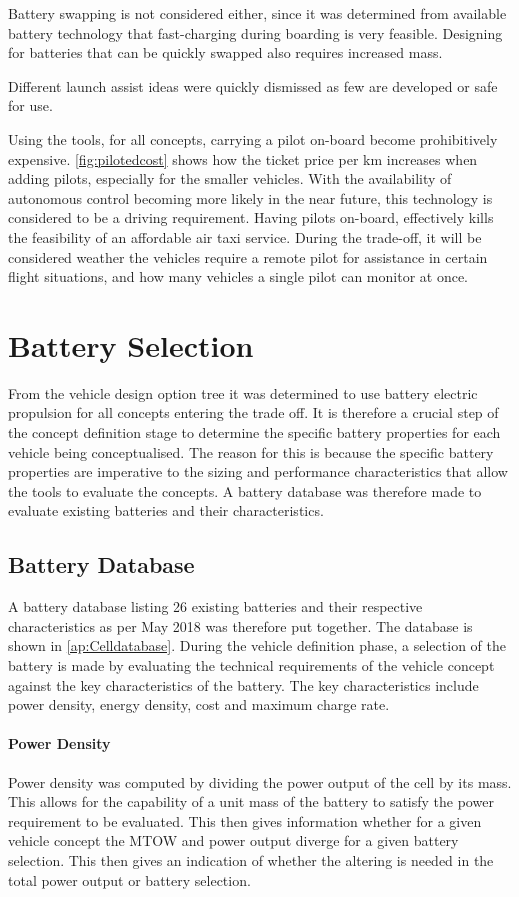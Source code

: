 Battery swapping is not considered either, since it was determined from available battery technology that fast-charging during boarding is very feasible. Designing for batteries that can be quickly swapped also requires increased mass.

Different launch assist ideas were quickly dismissed as few are developed or safe for use.

Using the tools, for all concepts, carrying a pilot on-board become prohibitively expensive. \autoref{fig:pilotedcost} shows how the ticket price per km increases when adding pilots, especially for the smaller vehicles. With the availability of autonomous control becoming more likely in the near future, this technology is considered to be a driving requirement. Having pilots on-board, effectively kills the feasibility of an affordable air taxi service. During the trade-off, it will be considered weather the vehicles require a remote pilot for assistance in certain flight situations, and how many vehicles a single pilot can monitor at once.



\section{Battery Selection}
 From the vehicle design option tree it was determined to use battery electric propulsion for all concepts entering the trade off. It is therefore a crucial step of the concept definition stage to determine the specific battery properties for each vehicle being conceptualised. The reason for this is because the specific battery properties are imperative to the sizing and performance characteristics that allow the tools to evaluate the concepts. A battery database was therefore made to evaluate existing batteries and their characteristics.

 \subsection{Battery Database}
 A battery database listing 26 existing batteries and their respective characteristics as per May 2018 was therefore put together. The database is shown in \autoref{ap:Celldatabase}. During the vehicle definition phase, a selection of the battery is made by evaluating the technical requirements of the vehicle concept against the key characteristics of the battery. The key characteristics include power density, energy density, cost and maximum charge rate. 
 \paragraph{Power Density} Power density was computed by dividing the power output of the cell by its mass. This allows for the capability of a unit mass of the battery to satisfy the power requirement to be evaluated. This then gives information whether for a given vehicle concept the MTOW and power output diverge for a given battery selection. This then gives an indication of whether the altering is needed in the total power output or battery selection. 
